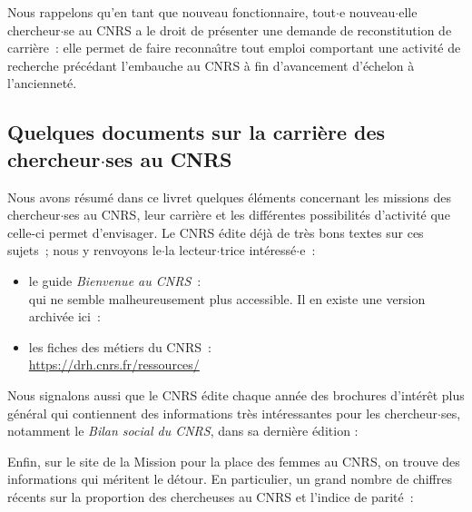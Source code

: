 


Nous rappelons qu'en tant que nouveau fonctionnaire, tout$\cdot$e nouveau$\cdot$elle chercheur$\cdot$se au CNRS
a le droit de pr\'esenter une demande de
reconstitution de carri\`ere~: elle permet de faire
reconna\^\i tre tout emploi comportant une activit\'e de
recherche pr\'ec\'edant l'embauche au CNRS \`a fin d'avancement
d'\'echelon \`a l'anciennet\'e.

\subsection{Quelques documents sur la carri\`ere des chercheur$\cdot$ses
au CNRS}

Nous avons r\'esum\'e dans ce livret quelques \'el\'ements
 concernant les missions des chercheur$\cdot$ses au CNRS, leur
carri\`ere et les diff\'erentes possibilit\'es d'activit\'e
que celle-ci permet d'envisager. Le CNRS \'edite d\'ej\`a de
tr\`es bons textes sur ces sujets~; nous y renvoyons le$\cdot$la lecteur$\cdot$trice
int\'eress\'e$\cdot$e~:
\begin{itemize}
\item le guide {\em Bienvenue au CNRS}~:\\
 qui ne semble malheureusement plus accessible.
Il en existe une version archivée ici~:\\
\item les fiches des m\'etiers du CNRS~:\\
\url{https://drh.cnrs.fr/ressources/}
\end{itemize}

Nous signalons aussi que le CNRS \'edite chaque ann\'ee des
brochures d'int\'er\^et plus g\'en\'eral qui contien\-nent
des informations tr\`es int\'eressantes pour les chercheur$\cdot$ses,
notamment le {\em Bilan social du CNRS}, dans sa derni\`ere
\'edition :~\\


%
Enfin, sur le site de la Mission pour la place des femmes au CNRS,
on trouve des informations  qui m\'eritent le d\'etour. En particulier, un grand nombre de chiffres r\'ecents sur la proportion des chercheuses au CNRS
et l'indice de parit\'e~:\\

